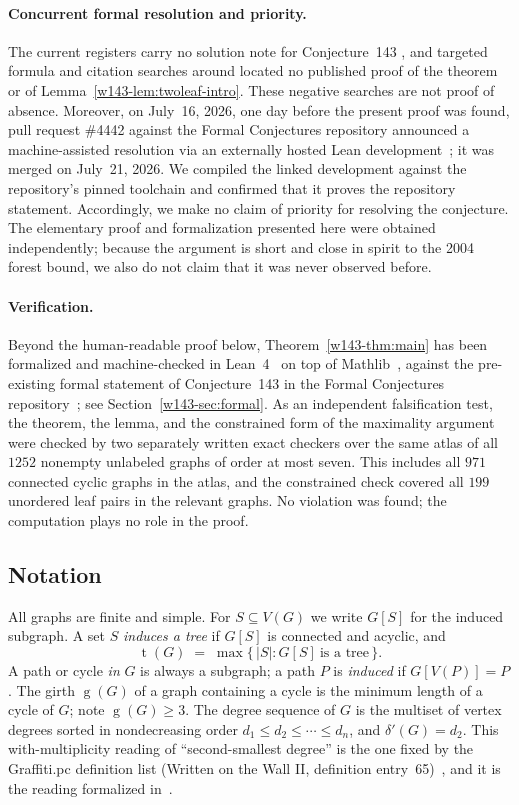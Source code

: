 \documentclass[11pt]{article}
\numberwithin{equation}{section}
\theoremstyle{remark}
\newcommand{\tr}{\operatorname{t}}
\newcommand{\gr}{\operatorname{g}}
\newcommand{\dd}{\delta'}
\begin{document}
\paragraph{Concurrent formal resolution and priority.}
The current registers carry no solution note for Conjecture~143
\cite{WestReg,FC143}, and targeted formula and citation searches around
\cite{ESS86,DW04,HMS14} located no published proof of the theorem or of
Lemma~\ref{w143-lem:twoleaf-intro}.  These negative searches are not proof of
absence.  Moreover, on July~16, 2026, one day before the present proof was
found, pull request \#4442 against the Formal Conjectures repository
announced a machine-assisted resolution via an externally hosted Lean
development~\cite{FC4442}; it was merged on July~21, 2026.  We compiled the
linked development against the repository's pinned toolchain and confirmed
that it proves the repository statement.
Accordingly, we make no claim of priority for resolving the conjecture.  The
elementary proof and formalization presented here were obtained independently;
because the argument is short and close in spirit to the 2004 forest bound,
we also do not claim that it was never observed before.

\paragraph{Verification.}
Beyond the human-readable proof below, Theorem~\ref{w143-thm:main} has been
formalized and machine-checked in Lean~4~\cite{Lean4} on top of
Mathlib~\cite{mathlib}, against the pre-existing formal statement of
Conjecture~143 in the Formal Conjectures repository~\cite{FC143}; see
Section~\ref{w143-sec:formal}.  As an independent falsification test, the theorem,
the lemma, and the constrained form of the maximality argument were checked by
two separately written exact checkers over the same atlas of all $1252$ nonempty unlabeled graphs of
order at most seven.  This includes all $971$ connected cyclic graphs in the
atlas, and the constrained check covered all $199$ unordered leaf pairs in
the relevant graphs.  No violation was found; the computation plays no role
in the proof.

\subsection{Notation}

All graphs are finite and simple.  For $S\subseteq V(G)$ we write $G[S]$ for
the induced subgraph.  A set $S$ \emph{induces a tree} if $G[S]$ is connected
and acyclic, and
\[
  \tr(G)\;=\;\max\{\,|S| : G[S]\ \text{is a tree}\,\}.
\]
A path or cycle \emph{in} $G$ is always a subgraph; a path $P$ is
\emph{induced} if $G[V(P)]=P$.  The girth $\gr(G)$ of a graph containing a
cycle is the minimum length of a cycle of $G$; note $\gr(G)\ge3$.  The degree
sequence of $G$ is the multiset of vertex degrees sorted in nondecreasing
order $d_1\le d_2\le\cdots\le d_n$, and $\dd(G)=d_2$.  This with-multiplicity
reading of ``second-smallest degree'' is the one fixed by the Graffiti.pc
definition list (Written on the Wall II, definition entry~65)~\cite{WOWII},
and it is the reading formalized in~\cite{FC143}.
\end{document}
